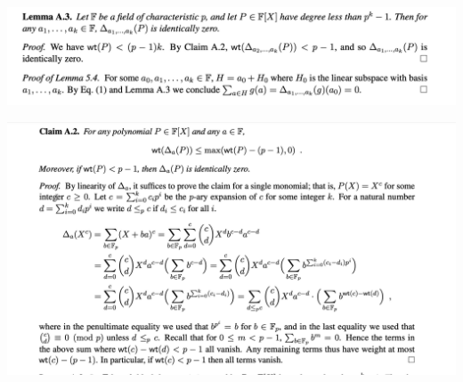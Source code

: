 \documentclass{beamer}
\begin{document}
\begin{frame}{}
	\begin{minipage}{0.42\linewidth}
		\includegraphics[scale=0.25]{p6.png}
	\end{minipage}
\end{frame}

\begin{frame}{}
	\begin{minipage}{0.42\linewidth}
		\includegraphics[scale=0.25]{p7.png}
	\end{minipage}
\end{frame}
\end{document}
